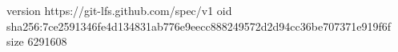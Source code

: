 version https://git-lfs.github.com/spec/v1
oid sha256:7ce2591346fe4d134831ab776e9eecc888249572d2d94cc36be707371e919f6f
size 6291608
